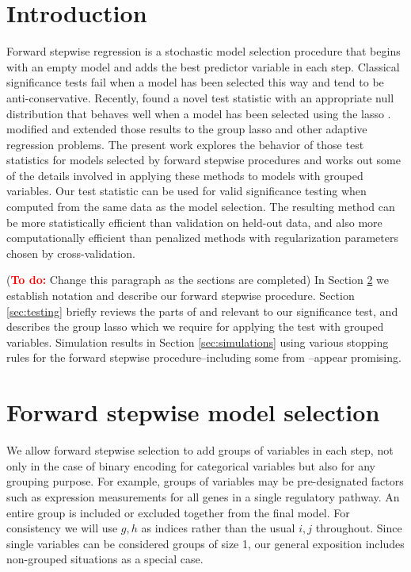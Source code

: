 \documentclass{imsart}
\newcommand{\todo}{\textcolor{red}{\textbf{To do: }}}
\begin{document}
\section{Introduction}
\label{sec:intro}

Forward stepwise regression is a stochastic model selection procedure
that begins with an empty model and adds the best predictor variable
in each step.  Classical significance tests fail when a model has been
selected this way and tend to be anti-conservative.  Recently,
\cite{significance:lasso} found a novel test statistic with an
appropriate null distribution that behaves well when a model has been
selected using the lasso \citep{tibshirani:lasso}.
\cite{tests:adaptive} modified and extended those results to the
group lasso \citep{grouplasso} and other adaptive regression
problems.  The present work explores the behavior of those test
statistics for models selected by forward stepwise procedures and
works out some of the details involved in applying these methods to
models with grouped variables.  Our test statistic can be
used for valid significance testing when computed from the same
data as the model selection.  The resulting method can
be more statistically efficient than validation on held-out data, and
also more computationally efficient than penalized methods with
regularization parameters chosen by cross-validation.



(\todo Change this paragraph as the sections are completed)
In Section \ref{sec:stepwise} we establish notation and describe our
forward stepwise procedure. Section \ref{sec:testing} briefly reviews
the parts of \cite{significance:lasso} and \cite{tests:adaptive}
relevant to our significance test, and describes the group lasso which
we require for applying the test with grouped
variables. Simulation results in Section \ref{sec:simulations} using
various stopping rules for the forward stepwise procedure--including
some from \cite{sequential:fdr}--appear promising.


\section{Forward stepwise model selection}
\label{sec:stepwise}

We allow forward stepwise selection to add groups of variables in each
step, not only in the case of binary encoding for categorical
variables but also for any grouping purpose. For example, groups of
variables may be pre-designated factors such as expression
measurements for all genes in a single regulatory pathway. An entire
group is included or excluded together from the final model. For
consistency we will use $g, h$ as indices rather than the usual $i, j$
throughout. Since single variables can be considered groups of size 1,
our general exposition includes non-grouped situations as a special case. 
\end{document}
